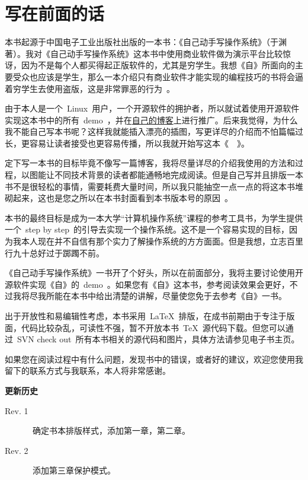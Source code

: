 \chapter{写在前面的话} \label{fore}


\begin{kaitext}

本书起源于中国电子工业出版社出版的一本书：《自己动手写操作系统》（于渊著）。我对《自己动手写操作系统》这本书中使用商业软件做为演示平台比较惊讶，因为不是每个人都买得起正版软件的，尤其是穷学生。我想《自》所面向的主要受众也应该是学生，那么一本介绍只有商业软件才能实现的编程技巧的书将会逼着穷学生去使用盗版，这是非常罪恶的行为~\frownie。

由于本人是一个~Linux~用户，一个开源软件的拥护者，所以就试着使用开源软件实现这本书中的所有~demo~，并在\href{http://yangwenbo.com}{自己的博客}上进行推广。后来我觉得，为什么我不能自己写本书呢？这样我就能插入漂亮的插图，写更详尽的介绍而不怕篇幅过长，更容易让读者接受也更容易传播，所以我就开始写这本《~\BookName~》。

定下写一本书的目标毕竟不像写一篇博客，我将尽量详尽的介绍我使用的方法和过程，以图能让不同技术背景的读者都能通畅地完成阅读。但是自己写并且排版一本书不是很轻松的事情，需要耗费大量时间，所以我只能抽空一点一点的将这本书堆砌起来，这也是您之所以在本书封面看到本书版本号的原因~\smiley。

本书的最终目标是成为一本大学“计算机操作系统”课程的参考工具书，为学生提供一个~step by step~的引导去实现一个操作系统。这不是一个容易实现的目标，因为我本人现在并不自信有那个实力了解操作系统的方方面面。但是我想，立志百里行九十总好过于踯躅不前。

《自己动手写操作系统》一书开了个好头，所以在前面部分，我将主要讨论使用开源软件实现《自》的~demo~。如果您有《自》这本书，参考阅读效果会更好，不过我将尽我所能在本书中给出清楚的讲解，尽量使您免于去参考《自》一书。

出于开放性和易编辑性考虑，本书采用~\LaTeX~排版，在成书前期由于专注于版面，代码比较杂乱，可读性不强，暂不开放本书~\TeX~源代码下载。但您可以通过~SVN check out~所有本书相关的源代码和图片，具体方法请参见电子书主页。

如果您在阅读过程中有什么问题，发现书中的错误，或者好的建议，欢迎您使用我留下的联系方式与我联系，本人将非常感谢。
\vskip 1cm
\noindent
{}
\end{kaitext}

\begin{lined}{\textwidth}
\textbf{更新历史}
\small
\begin{description}
    \item[Rev. 1]~确定书本排版样式，添加第一章，第二章。
    \item[Rev. 2]~添加第三章保护模式。
\end{description}
\vspace{2ex}
\end{lined}

